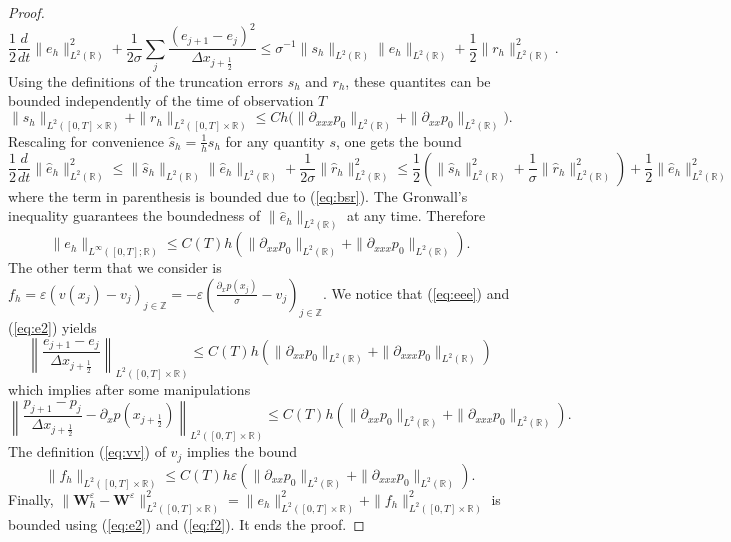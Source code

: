 \documentclass[a4paper,french,english,10pt]{article}
\newcommand\eps{\varepsilon}
\newcommand\W{\mathbf{W}}
\begin{document}
\begin{proof}
\begin{equation} \label{eq:eee}
\frac12 \frac{d}{dt} \|e_h\|_{L^2(\mathbb{R})}^2+
\frac{1}{2 \sigma} \sum_j
\frac{(e_{j+1}-e_{j})^2}{\Delta x_{j+\frac12 }}\leq
\sigma^{-1}\| s_h\|_{L^2(\mathbb{R})} \|e_h\|_{L^2(\mathbb{R})}+
\frac12 \|r_h\|^2_{L^2(\mathbb{R})}.
\end{equation}
Using the  definitions of  the truncation errors $s_h$ and $r_h$, these
quantites can be   
bounded independently of the time of observation $T$ 
\begin{equation} \label{eq:bsr}
\|s_h\|_{L^2([0,T]\times\mathbb{R})}+
\|r_h\|_{L^2([0,T]\times\mathbb{R})}  \leq C h \bigg(
 \|\partial_{xxx}p_0   \| _{L^2(\mathbb{R})}+\|\partial_{xx}p_0\| _{L^2(\mathbb{R})} \bigg).
\end{equation}
Rescaling  for convenience $\widehat s_h=\frac1hs_h$ for any quantity
$s$, one gets the bound
$$
\frac12 \frac{d}{dt} \|\widehat e_h\|_{L^2(\mathbb{R})}^2
\leq
\| \widehat s_h\|_{L^2(\mathbb{R})} \|\widehat e_h\|_{L^2(\mathbb{R})}+
\frac{1}{2\sigma} \|\widehat r_h\|^2_{L^2(\mathbb{R})}
\leq
\frac12
\left(\| \widehat s_h\|_{L^2(\mathbb{R})}^2+ \frac{1}{\sigma} \|\widehat r_h\|^2_{L^2(\mathbb{R})}  \right)+\frac12 
 \|\widehat e_h\|^2_{L^2(\mathbb{R})}
$$
where the term in parenthesis is bounded due to (\ref{eq:bsr}).
The Gronwall's inequality guarantees the boundedness of
$\|\widehat e_h\|_{L^2(\mathbb{R})}$ at any time.
Therefore
\begin{equation} \label{eq:e2}
\| e_h\|_{L^\infty([0,T];\mathbb{R})}\leq C(T) h 
\left(  \|\partial_{xx}p_0   \| _{L^2(\mathbb{R})}+
 \|\partial_{xxx}p_0   \| _{L^2(\mathbb{R})}
\right).
\end{equation}
The other term 
that we consider  is
$
f_h=\eps\left(v(x_j)-v_j    \right)_{j\in \mathbb Z}=-\eps
\left(\frac{\partial_x p(x_j)}{\sigma}- v_j  \right)_{j\in \mathbb Z}$.
We notice that (\ref{eq:eee}) and (\ref{eq:e2}) yields
$$
\left\| 
\frac{e_{j+1}-e_{j}}{\Delta x_{j+\frac12 }} \right\|_{
L^2([0,T]\times\mathbb{R})
}
\leq C(T) h 
\left(  \|\partial_{xx}p_0   \| _{L^2(\mathbb{R})}+
 \|\partial_{xxx}p_0   \| _{L^2(\mathbb{R})}
\right)
$$
which implies after some  manipulations
$$
\left\| 
\frac{p_{j+1}-p_{j}}{\Delta x_{j+\frac12 }} -\partial_x p (x_{j+\frac12}) \right\|_{
L^2([0,T]\times\mathbb{R})
}
\leq C(T) h 
\left(  \|\partial_{xx}p_0   \| _{L^2(\mathbb{R})}+
 \|\partial_{xxx}p_0   \| _{L^2(\mathbb{R})}
\right).
$$
The definition (\ref{eq:vv}) of $v_j$ 
implies 
the bound
\begin{equation} \label{eq:f2}
\|f_h\|_{
L^2([0,T]\times\mathbb{R})
}\leq C(T) h \eps \left(  \|\partial_{xx}p_0   \| _{L^2(\mathbb{R})}+
 \|\partial_{xxx}p_0   \| _{L^2(\mathbb{R})}
\right).
\end{equation}
Finally, 
$\|\W_h^\eps-\W^\eps\|_{L^2([0,T]\times\mathbb{R})}^2=
\|e_h\|_{L^2([0,T]\times\mathbb{R})}^2+\|f_h\|_{L^2([0,T]\times\mathbb{R
})}^2
$ 
is bounded using (\ref{eq:e2}) and (\ref{eq:f2}).
It ends the proof.
\end{proof}
\end{document}
